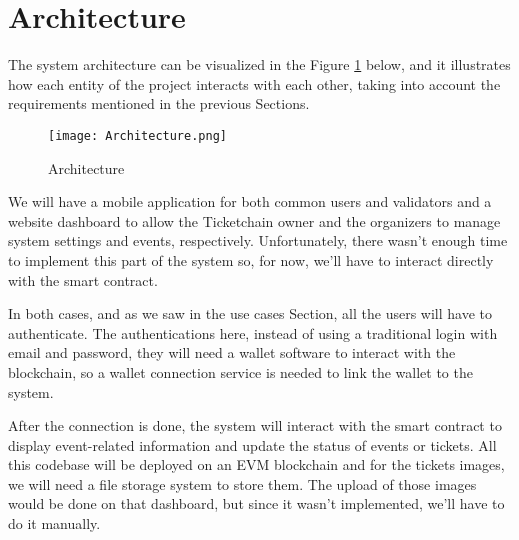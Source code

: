 \section{Architecture}
\label{sec:architecture}

The system architecture can be visualized in the Figure \ref{fig:architecture}
below, and it illustrates how each entity of the project interacts with each
other, taking into account the requirements mentioned in the previous Sections.

\begin{figure}[H]
    \texttt{[image: Architecture.png]}
    \centering
    \caption{Architecture}
    \label{fig:architecture}
\end{figure}

We will have a mobile application for both common users and validators and a
website dashboard to allow the Ticketchain owner and the organizers to manage
system settings and events, respectively. Unfortunately, there wasn't enough
time to implement this part of the system so, for now, we'll have to interact
directly with the smart contract.

In both cases, and as we saw in the use cases Section, all the users will have
to authenticate. The authentications here, instead of using a traditional login
with email and password, they will need a wallet software to interact with the
blockchain, so a wallet connection service is needed to link the wallet to the
system.

After the connection is done, the system will interact with the smart contract
to display event-related information and update the status of events or
tickets. All this codebase will be deployed on an EVM blockchain and for the
tickets images, we will need a file storage system to store them. The upload of
those images would be done on that dashboard, but since it wasn't implemented,
we'll have to do it manually.
